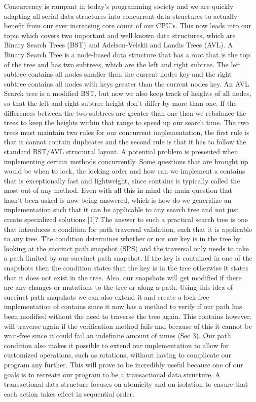 \documentclass[conference]{IEEEtran}
\begin{document}
Concurrency is rampant in today's programming society and we are quickly adapting all serial data structures into concurrent data structures to actually benefit from our ever increasing core count of our CPU's. This now leads into our topic which covers two important and well known data structures, which are Binary Search Trees (BST) and Adelson-Velskii and Landis Trees (AVL). A Binary Search Tree is a node-based data structure that has a root that is the top of the tree and has two subtrees, which are the left and right subtree. The left subtree contains all nodes smaller than the current nodes key and the right subtree contains all nodes with keys greater than the current nodes key. An AVL Search tree is a modified BST, but now we also keep track of heights of all nodes, so that the left and right subtree height don't differ by more than one. If the differences between the two subtrees are greater than one then we rebalance the trees to keep the heights within that range to speed up our search time. The two trees must maintain two rules for our concurrent implementation, the first rule is that it cannot contain duplicates and the second rule is that it has to follow the standard BST/AVL structural layout.
	A potential problem is presented when implementing certain methods concurrently. Some questions that are brought up would be when to lock, the locking order and how can we implement a contains that is exceptionally fast and lightweight, since contains is typically called the most out of any method. Even with all this in mind the main question that hasn't been asked is now being answered, which is how do we generalize an implementation such that it can be applicable to any search tree and not just create specialized solutions [1]? The answer to such a practical search tree is one that introduces a condition for path traversal validation, such that it is applicable to any tree. The condition determines whether or not our key is in the tree by looking at the succinct path snapshot (SPS) and the traversal only needs to take a path limited by our succinct path snapshot. If the key is contained in one of the snapshots then the condition states that the key is in the tree otherwise it states that it does not exist in the tree.  Also, our snapshots will get modified if there are any changes or mutations to the tree or along a path. Using this idea of succinct path snapshots we can also extend it and create a lock-free implementation of contains since it now has a method to verify if our path has been modified without the need to traverse the tree again. This contains however, will traverse again if the verification method fails and because of this it cannot be wait-free since it could fail an indefinite amount of times (Sec 3).
	Our path condition also makes it possible to extend our implementation to allow for customized operations, such as rotations, without having to complicate our program any further. This will prove to be incredibly useful because one of our goals is to recreate our program to be a transactional data structure. A transactional data structure focuses on atomicity and on isolation to ensure that each action takes effect in sequential order.
\end{document}
